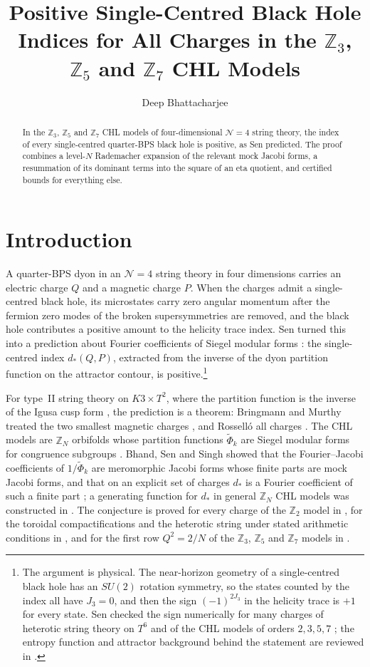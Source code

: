 \documentclass[11pt]{amsart}
\title[Positive Indices for All Charges in CHL Models]{Positive Single-Centred Black Hole Indices for All Charges in the $\mathbb Z_3$, $\mathbb Z_5$ and $\mathbb Z_7$ CHL Models}
\author{Deep Bhattacharjee}
\numberwithin{equation}{section}
\theoremstyle{plain}
\theoremstyle{definition}
\theoremstyle{remark}
\newcommand{\Z}{\mathbb{Z}}
\newcommand{\tPhi}{\widetilde{\Phi}}
\begin{document}
\begin{abstract}
In the $\Z_3$, $\Z_5$ and $\Z_7$ CHL models of four-dimensional $\mathcal N=4$ string theory, the index of every single-centred quarter-BPS black hole is positive, as Sen predicted. The proof combines a level-$N$ Rademacher expansion of the relevant mock Jacobi forms, a resummation of its dominant terms into the square of an eta quotient, and certified bounds for everything else.
\end{abstract}
\maketitle

\section{Introduction}

A quarter-BPS dyon in an $\mathcal N=4$ string theory in four dimensions carries an electric charge $Q$ and a magnetic charge $P$. When the charges admit a single-centred black hole, its microstates carry zero angular momentum after the fermion zero modes of the broken supersymmetries are removed, and the black hole contributes a positive amount to the helicity trace index. Sen turned this into a prediction about Fourier coefficients of Siegel modular forms \cite{Sen11}: the single-centred index $d_*(Q,P)$, extracted from the inverse of the dyon partition function on the attractor contour, is positive.\footnote{The argument is physical. The near-horizon geometry of a single-centred black hole has an $SU(2)$ rotation symmetry, so the states counted by the index all have $J_3=0$, and then the sign $(-1)^{2J_3}$ in the helicity trace is $+1$ for every state. Sen checked the sign numerically for many charges of heterotic string theory on $T^6$ and of the CHL models of orders $2,3,5,7$ \cite{Sen11}; the entropy function and attractor background behind the statement are reviewed in \cite{Sen08}.}

For type~II string theory on $K3\times T^2$, where the partition function is the inverse of the Igusa cusp form \cite{DVV97}, the prediction is a theorem: Bringmann and Murthy treated the two smallest magnetic charges \cite{BM13}, and Rossell\'o all charges \cite{Ros24}. The CHL models \cite{CHL95} are $\Z_N$ orbifolds whose partition functions $\tPhi_k$ are Siegel modular forms for congruence subgroups \cite{JS06,DJS06}. Bhand, Sen and Singh showed that the Fourier--Jacobi coefficients of $1/\tPhi_k$ are meromorphic Jacobi forms whose finite parts are mock Jacobi forms, and that on an explicit set of charges $d_*$ is a Fourier coefficient of such a finite part \cite{BSS25}; a generating function for $d_*$ in general $\Z_N$ CHL models was constructed in \cite{Sin26}. The conjecture is proved for every charge of the $\Z_2$ model in \cite{Bha26a}, for the toroidal compactifications and the heterotic string under stated arithmetic conditions in \cite{Bha26b}, and for the first row $Q^2=2/N$ of the $\Z_3$, $\Z_5$ and $\Z_7$ models in \cite{Bha26c}.
\end{document}
